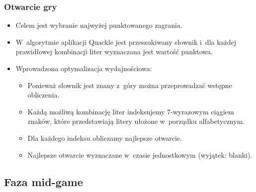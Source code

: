 \documentclass[10pt,a4paper]{beamer}
\begin{document}
\begin{frame}
	\frametitle{Otwarcie gry}

	\begin{itemize}
		\item Celem jest wybranie najwyżej punktowanego zagrania.
		\item W~algorytmie aplikacji Quackle jest przeszukiwany słownik i~dla każdej prawidłowej kombinacji liter wyznaczana jest wartość punktowa.
		\item Wprowadzona optymalizacja wydajnościowa:
			\begin{itemize}
				\item Ponieważ słownik jest znany z~góry można przeprowadzać wstępne obliczenia.
				\item Każdą możliwą kombinację liter indeksujemy 7-wyrazowym ciągiem znaków, które przedstawiają litery ułożone w~porządku alfabetycznym.
				\item Dla każdego indeksu obliczamy najlepsze otwarcie.
				\item Najlepsze otwarcie wyznaczane w~czasie jednostkowym (wyjątek: blanki).
			\end{itemize}
	\end{itemize}
\end{frame}

\subsection{Faza mid-game}
\captionsetup[figure]{skip=2pt}
\end{document}
